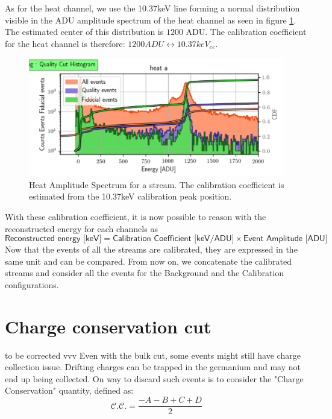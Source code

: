 As for the heat channel, we use the 10.37keV line forming a normal distribution visible in the ADU amplitude spectrum of the heat channel as seen in figure \ref{fig:calibration-heat}. The estimated center of this distribution is $1200$ ADU. The calibration coefficient for the heat channel is therefore: $1200 ADU \leftrightarrow 10.37 keV_{ee}$.

\begin{figure}
\centering
\includegraphics[width=\linewidth,]{Figures/Neutron/calibration_heat.png}
\caption{Heat Amplitude Spectrum for a stream. The calibration coefficient is estimated from the 10.37keV calibration peak position.}
\label{fig:calibration-heat}
\end{figure}

With these calibration coefficient, it is now possible to reason with the reconstructed energy for each channels as
$$
\textsf{Reconstructed energy [keV]}
=
\textsf{Calibration Coefficient [keV/ADU]}
\times
\textsf{Event Amplitude [ADU]}
$$
Now that the events of all the streams are calibrated, they are expressed in the same unit and can be compared. From now on, we concatenate the calibrated streams and consider all the events for the Background and the Calibration configurations.


\section{Charge conservation cut}
\label{par:charge-conservation-cut}

to be corrected vvv
Even with the bulk cut, some events might still have charge collection issue. Drifting charges can be trapped in the germanium and may not end up being collected. On way to discard such events is to consider the "Charge Conservation" quantity, defined as:
\begin{equation}
\mathcal{C.C.} = \frac{-A-B+C+D}{2}
\end{equation}


